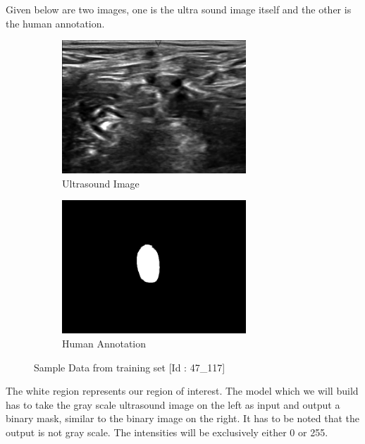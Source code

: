 \documentclass[12pt, a4paper]{article}
\begin{document}
Given below are two images, one is the ultra sound image itself and the other is the human annotation.
\\
\begin{figure}[h] 
\begin{subfigure}{0.5\textwidth}
\includegraphics[width=\linewidth, height=5cm]{47_117.png} 
\caption{Ultrasound Image}
\label{fig:ultrasoundimage}
\end{subfigure}
\begin{subfigure}{0.5\textwidth}
\includegraphics[width=\linewidth, height=5cm]{47_117_mask.png}
\caption{Human Annotation}
\label{fig:humanannotation}
\end{subfigure}
\caption{Sample Data from training set [Id : 47\_117]}
\label{fig:dataimage}
\end{figure}
The white region represents our region of interest. The model which we will build has to take the gray scale ultrasound image on the left as input and output a binary mask, similar to the binary image on the right. It has to be noted that the output is not gray scale. The intensities will be exclusively either 0 or 255.
\end{document}
